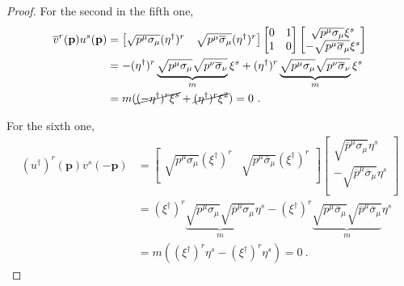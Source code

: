 \begin{proof}
        For the second in the fifth one, 
        \begin{equation*}
        \begin{aligned}
            \overline v^r (\mathbf p) u^s (\mathbf p) & = \begin{bmatrix}
                \sqrt{p^\mu \sigma_\mu} (\eta^\dagger)^r & \sqrt{p^\mu \overline \sigma_\mu} (\eta^\dagger)^r \\
            \end{bmatrix} \begin{bmatrix}
                0 & 1 \\ 1 & 0 \\
            \end{bmatrix} \begin{bmatrix}
                \sqrt{p^\mu \sigma_\mu} \xi^s \\ - \sqrt{p^\mu \overline \sigma_\mu} \xi^s \\
            \end{bmatrix} \\ & = - (\eta^\dagger)^r \underbrace{\sqrt{p^\mu  \sigma_\mu} \sqrt{p^\nu \overline \sigma_\nu}}_m \xi^s + (\eta^\dagger)^r \underbrace{\sqrt{p^\mu \sigma_\mu} \sqrt{p^\nu \overline \sigma_\nu}}_m \xi^s \\ & = m ( \cancel{(- \eta^\dagger)^r \xi^s} + \cancel{(\eta^\dagger)^r \xi^2}) = 0 ~.
        \end{aligned}
        \end{equation*}

        For the sixth one, 
        \begin{equation*}
        \begin{aligned}
            (u^\dagger)^r (\mathbf p) v^s (- \mathbf p) & = \begin{bmatrix}
                \sqrt{p^\mu \sigma_\mu} (\xi^\dagger)^r & \sqrt{p^\mu \overline \sigma_\mu} (\xi^\dagger)^r \\
            \end{bmatrix} \begin{bmatrix}
                \sqrt{\overline p^\mu \sigma_\mu} \eta^s \\ - \sqrt{\overline p^\mu \overline \sigma_\mu} \eta^s \\
            \end{bmatrix} \\ & = (\xi^\dagger)^r \underbrace{\sqrt{p^\mu \sigma_\mu} \sqrt{\overline p^\mu \sigma_\mu}}_m \eta^s - (\xi^\dagger)^r \underbrace{\sqrt{p^\mu \overline \sigma_\mu} \sqrt{\overline p^\mu \overline \sigma_\mu}}_m \eta^s \\ & = m ((\xi^\dagger)^r \eta^s - (\xi^\dagger)^r \eta^s) = 0 ~.
        \end{aligned}
        \end{equation*}


\end{proof}
